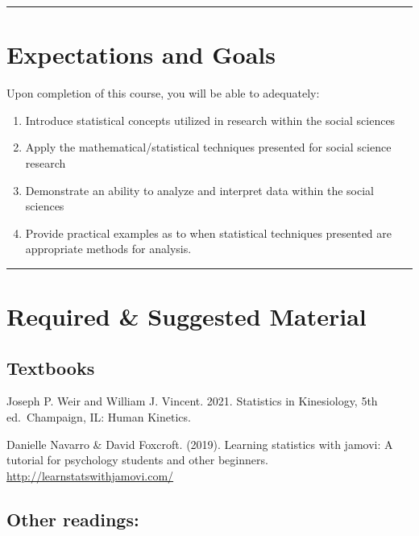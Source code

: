 \documentclass[11pt,]{article}
\providecommand{\tightlist}{%
  \setlength{\itemsep}{0pt}\setlength{\parskip}{0pt}}
\begin{document}
\begin{center}\rule{0.5\linewidth}{0.5pt}\end{center}

\hypertarget{expectations-and-goals}{%
\section{Expectations and Goals}\label{expectations-and-goals}}

Upon completion of this course, you will be able to adequately:

\begin{enumerate}
\def\labelenumi{\arabic{enumi}.}
\tightlist
\item
  Introduce statistical concepts utilized in research within the social
  sciences
\item
  Apply the mathematical/statistical techniques presented for social
  science research
\item
  Demonstrate an ability to analyze and interpret data within the social
  sciences
\item
  Provide practical examples as to when statistical techniques presented
  are appropriate methods for analysis.
\end{enumerate}

\begin{center}\rule{0.5\linewidth}{0.5pt}\end{center}

\hypertarget{required-suggested-material}{%
\section{Required \& Suggested
Material}\label{required-suggested-material}}

\hypertarget{textbook}{%
\subsection{Textbooks}\label{textbook}}

Joseph P. Weir and William J. Vincent. 2021. Statistics in Kinesiology,
5th ed.~Champaign, IL: Human Kinetics.

Danielle Navarro \& David Foxcroft. (2019). Learning statistics with
jamovi: A tutorial for psychology students and other beginners.
\url{http://learnstatswithjamovi.com/}

\hypertarget{other-readings}{%
\subsection{Other readings:}\label{other-readings}}
\end{document}
